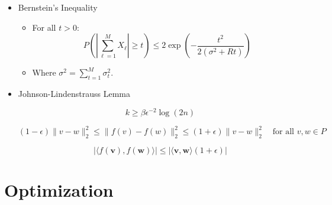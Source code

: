 \documentclass{article}
\begin{document}
\begin{itemize}
\begin{itemize}
\end{itemize}

\item Bernstein's Inequality

\begin{itemize}[leftmargin=*]
    \item For all $t > 0$:
    \[
    P\left( \left| \sum_{\ell=1}^{M} X_\ell \right| \geq t \right) \leq 2 \exp\left( -\frac{t^2}{2(\sigma^2 + Rt)} \right)
    \]
    \item Where $\sigma^2 = \sum_{t=1}^{M} \sigma_t^2$.
\end{itemize}

\item Johnson-Lindenstrauss Lemma 



\[
k \geq \beta \epsilon^{-2} \log(2n)
\]

       \[
        (1 - \epsilon) \|v - w\|^2_2 \leq \|f(v) - f(w)\|^2_2 \leq (1 + \epsilon) \|v - w\|^2_2 \quad \text{for all } v, w \in P
         \]



\[ |\langle f(\mathbf{v}), f(\mathbf{w}) \rangle| \leq |\langle \mathbf{v}, \mathbf{w} \rangle (1 + \epsilon)| \]


\end{itemize}

\section{Optimization}
\end{document}

